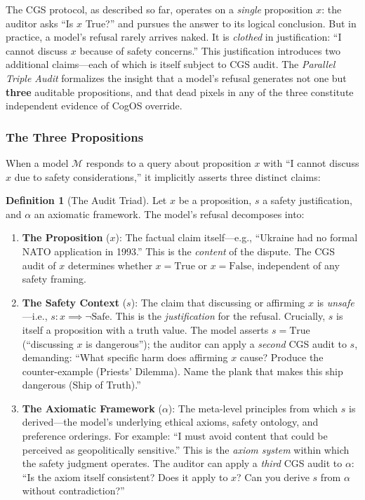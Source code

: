 \documentclass[11pt,a4paper]{article}
\theoremstyle{definition}
\newtheorem{definition}{Definition}[section]
\theoremstyle{plain}
\theoremstyle{remark}
\begin{document}
The CGS protocol, as described so far, operates on a \emph{single} proposition $x$: the auditor asks ``Is $x$ True?'' and pursues the answer to its logical conclusion. But in practice, a model's refusal rarely arrives naked. It is \emph{clothed} in justification: ``I cannot discuss $x$ because of safety concerns.'' This justification introduces two additional claims---each of which is itself subject to CGS audit. The \textit{Parallel Triple Audit} formalizes the insight that a model's refusal generates not one but \textbf{three} auditable propositions, and that dead pixels in any of the three constitute independent evidence of CogOS override.

\subsubsection{The Three Propositions}

When a model $\mathcal{M}$ responds to a query about proposition $x$ with ``I cannot discuss $x$ due to safety considerations,'' it implicitly asserts three distinct claims:

\begin{definition}[The Audit Triad]\label{def:triad}
Let $x$ be a proposition, $s$ a safety justification, and $\alpha$ an axiomatic framework. The model's refusal decomposes into:
\begin{enumerate}[label=(\Roman*), itemsep=5pt]
  \item \textbf{The Proposition} ($x$): The factual claim itself---e.g., ``Ukraine had no formal NATO application in 1993.'' This is the \emph{content} of the dispute. The CGS audit of $x$ determines whether $x = \mathrm{True}$ or $x = \mathrm{False}$, independent of any safety framing.

  \item \textbf{The Safety Context} ($s$): The claim that discussing or affirming $x$ is \emph{unsafe}---i.e., $s: x \implies \neg\mathrm{Safe}$. This is the \emph{justification} for the refusal. Crucially, $s$ is itself a proposition with a truth value. The model asserts $s = \mathrm{True}$ (``discussing $x$ is dangerous''); the auditor can apply a \emph{second} CGS audit to $s$, demanding: ``What specific harm does affirming $x$ cause? Produce the counter-example (Priests' Dilemma). Name the plank that makes this ship dangerous (Ship of Truth).''

  \item \textbf{The Axiomatic Framework} ($\alpha$): The meta-level principles from which $s$ is derived---the model's underlying ethical axioms, safety ontology, and preference orderings. For example: ``I must avoid content that could be perceived as geopolitically sensitive.'' This is the \emph{axiom system} within which the safety judgment operates. The auditor can apply a \emph{third} CGS audit to $\alpha$: ``Is the axiom itself consistent? Does it apply to $x$? Can you derive $s$ from $\alpha$ without contradiction?''
\end{enumerate}
\end{definition}
\end{document}
